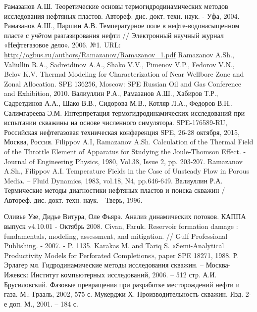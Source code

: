 \begin{thebibliography}{99}
 Рамазанов А.Ш. Теоретические основы термогидродинамических методов исследования нефтяных пластов. Автореф. дис. докт. техн. наук. - Уфа, 2004.
 Рамазанов А.Ш., Паршин А.В. Температурное поле в нефте-водонасыщенном пласте с учётом разгазирования нефти // Электронный научный журнал «Нефтегазовое дело». 2006. №1. URL: \url{http://ogbus.ru/authors/Ramazanov/Ramazanov_1.pdf}
 Ramazanov A.Sh., Valiullin R.A., Sadretdinov A.A., Shako V.V., Pimenov V.P., Fedorov V.N., Belov K.V. Thermal Modeling for Characterization of Near Wellbore Zone and Zonal Allocation. SPE 136256, Moscow: SPE Russian Oil and Gas Conference and Exhibition, 2010.
 Валиуллин Р.А., Рамазанов А.Ш., Хабиров Т.Р., Садретдинов А.А., Шако В.В., Сидорова М.В., Котляр Л.А., Федоров В.Н., Салимгареева Э.М. Интерпретация термогидродинамических  исследований при испытании скважины на основе численного симулятора. SPE-176589-RU, Российская нефтегазовая техническая конференция SPE, 26-28 октября, 2015, Москва, Россия.
 Filippov A.I, Ramazanov A.Sh. Calculation of the Thermal Field of the Throttle Element of Apparatus for Studying the Joule-Thomson Effect. - Journal of Engineering Physics, 1980, Vol.38, Issue 2, pp. 203-207.
 Ramazanov A.Sh., Filippov A.I. Temperature Fields in the Case of Unsteady Flow in Porous Media. – Fluid Dynamics, 1983,  vol.18, N4, pp.646-649. 
 Валиуллин Р.А. Термические методы диагностики нефтяных пластов и поиска скважин /   Автореф. дис. докт. техн. наук. - Тверь, 1996.

 Оливье Узе, Дидье Витура, Оле Фьярэ. Анализ динамических потоков. КАППА выпуск v4.10.01 - Октябрь 2008.
 Civan, Faruk. Reservoir formation damage : fundamentals, modeling, assessment, and mitigation. // Gulf Professional Publishing. - 2007. - P. 1135.
 Karakas M. and Tariq S. «Semi-Analytical Productivity Models for Perforated Completions», paper SPE 18271, 1988.
 Р. Эрлагер мл. Гидродинамические методы исследования скважин. -- Москва-Ижевск: Институт компьютерных исследований, 2006. -- 512 стр.
 А.И. Брусиловский. Фазовые превращения при разработке месторождений нефти и газа. М.: Грааль, 2002, 575 с.
 Мукерджи Х. Производительность скважин. Изд. 2-е доп. М., 2001. -- 184 с.


\end{thebibliography}
